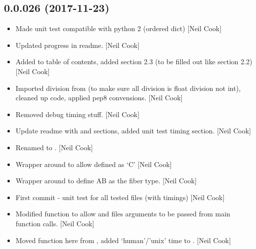 \documentclass[a4paper,10pt,english]{report}
\begin{document}
\subsection{0.0.026 (2017-11-23)}
\label{\detokenize{misc/changelog:id525}}\begin{itemize}
\item {} 
Made unit test compatible with python 2 (ordered dict) {[}Neil Cook{]}

\item {} 
Updated progress in readme. {[}Neil Cook{]}

\item {} 
Added to table of contents, added section 2.3 (to be filled out like
section 2.2) {[}Neil Cook{]}

\item {} 
Imported division from  (to make sure all division is float
division not int), cleaned up code, applied pep8 convensions. {[}Neil
Cook{]}

\item {} 
Removed debug timing stuff. {[}Neil Cook{]}

\item {} 
Update readme with  and  sections, added unit test
timing section. {[}Neil Cook{]}

\item {} 
Renamed  to . {[}Neil Cook{]}

\item {} 
Wrapper around  to allow  defined as
‘C’ {[}Neil Cook{]}

\item {} 
Wrapper around  to define AB as the fiber type.
{[}Neil Cook{]}

\item {} 
First commit - unit test for all tested files (with timings) {[}Neil
Cook{]}

\item {} 
Modified  function to allow  and files
arguments to be passed from main function calls. {[}Neil Cook{]}

\item {} 
Moved  function here from , added
‘human’/’unix’ time to . {[}Neil Cook{]}


\end{itemize}
\end{document}
